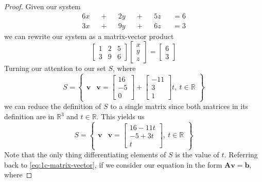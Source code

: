 \documentclass[]{article}
\begin{document}
\begin{proof}
Given our system
\begin{alignat}{6}
	x && + && 2y && + && 5z && = 6 \\
	3x && + && 9y && + && 6z && = 3
\end{alignat}
we can rewrite our system as a matrix-vector product
\begin{equation}\label{eq:1c-matrix-vector}
	\begin{bmatrix}
	1 & 2 & 5 \\
	3 & 9 & 6 
	\end{bmatrix}
	\begin{bmatrix}
	x \\
	y \\
	z
	\end{bmatrix}
	=
	\begin{bmatrix}
	6 \\
	3
	\end{bmatrix}
\end{equation}
Turning our attention to our set \(S\), where
\begin{equation}
	S = 
	\left\lbrace
	\begin{array}{c|c}
	\mathbf{v} & \mathbf{v} = 
	\begin{bmatrix}
	16 \\
	-5 \\
	0
	\end{bmatrix}
	+
	\begin{bmatrix}
	-11 \\
	3 \\
	1
	\end{bmatrix}t, \ t \in \mathbb{R}
	\end{array}
	\right\rbrace
\end{equation}
we can reduce the definition of \(S\) to a single matrix since both matrices in its definition are in \(\mathbb{R}^3\) and \(t \in \mathbb{R}\). This yields us
\begin{equation}
	S = 
	\left\lbrace
	\begin{array}{c|c}
	\mathbf{v} & \mathbf{v} = 
	\begin{bmatrix}
	16 - 11t \\
	-5 + 3t \\
	t
	\end{bmatrix}, \ t \in \mathbb{R}
	\end{array}
	\right\rbrace
\end{equation}
Note that the only thing differentiating elements of \(S\) is the value of \(t\). Referring back to \autoref{eq:1c-matrix-vector}, if we consider our equation in the form \(\mathbf{Av} = \mathbf{b}\), where 

\end{proof}
\end{document}
